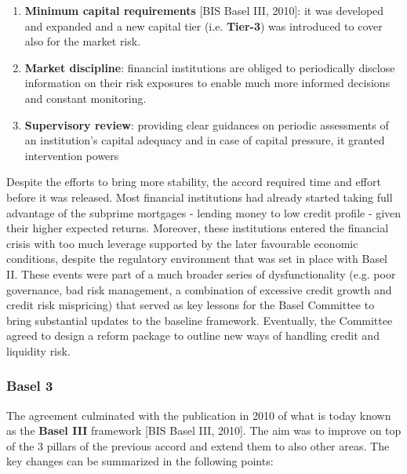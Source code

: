 \documentclass[a4paper,12pt]{article}
\begin{document}
    \begin{enumerate}
        \item \textbf{Minimum capital requirements} [BIS Basel III, 2010]: it was developed and expanded and a new capital tier (i.e. \textbf{Tier-3}) was introduced to cover also for the market risk.
        \item \textbf{Market discipline}: financial institutions are obliged to periodically disclose information on their risk exposures to enable much more informed decisions and constant monitoring.
        \item \textbf{Supervisory review}: providing clear guidances on periodic assessments of an institution's capital adequacy and in case of capital pressure, it granted intervention powers
    \end{enumerate}

    Despite the efforts to bring more stability, 
    the accord required time and effort before it was released. 
    Most financial institutions had already started taking 
    full advantage of the subprime mortgages - lending money to low credit profile - 
    given their higher expected returns. 
    Moreover, these institutions entered the financial crisis with too much leverage 
    supported by the later favourable economic conditions, despite the regulatory 
    environment that was set in place with Basel II. These events were part of a 
    much broader series of dysfunctionality (e.g. poor governance, bad risk management, 
    a combination of excessive credit growth and credit risk mispricing) 
    that served as key lessons for the Basel Committee to bring substantial updates 
    to the baseline framework. Eventually, the Committee agreed to design a reform 
    package to outline new ways of handling credit and liquidity risk.

    \subsubsection[]{Basel 3}
    The agreement culminated with the publication in 2010 of what is today known 
    as the \textbf{Basel III} framework [BIS Basel III, 2010]. The aim was to improve on top of the 3 
    pillars of the previous accord and extend them to also other areas. 
    The key changes can be summarized in the following points:
    
\end{document}
